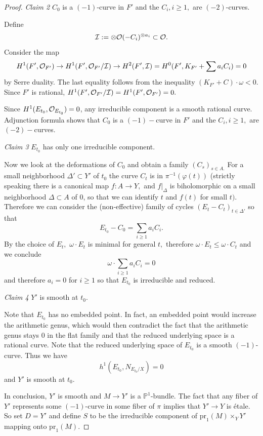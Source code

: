\documentclass[a4, 12pt]{amsart}
\numberwithin{equation}{section}
\theoremstyle{definition}
\def\cI{\mathcal{I}}
\def\P{\mathbb{P}}
\def\P{\mathbb{P}}
\def\cI{\mathcal{I}}
\begin{document}
\begin{proof}
{\it Claim 2} $C_0 $ is a $(-1)$-curve in $F'$ and the $C_i, i \geq 1,$ are $(-2)$-curves.

Define
$$\cI:= \otimes \cO(-C_i)^{\otimes a_i} \subset \cO.$$
Consider the map
$$H^1(F', \cO_{F'}) \to H^1(F', \cO_{F'} / \cI) \to H^2(F', \cI)=H^0(F',K_{F'}+\sum a_i C_i )=0$$
by Serre duality.
The last equality follows from the inequality $(K_{F'}+C) \cdot \omega <0.$
Since $F'$ is rational, $H^1(F', \cO_{F'} / \cI)=H^1(F', \cO_{F'} )=0.$

Since $H^1(E_{t_0}, \mathcal{O}_{E_{t_0}})=0$, any irreducible component is a smooth rational curve.
Adjunction formula shows that
$C_0 $ is a $(-1)-$curve in $F'$ and the $C_i, i \geq 1,$ are $(-2)-$curves.

{\it Claim 3} $E_{t_0}$ has only one irreducible component.

Now we look at the deformations of $C_0$ and obtain a family
$(C_s)_{s \in A.}$ For a small neighborhood $\Delta' \subset Y'$ of $t_0$ the curve $C_t $ is in $\pi^{-1}(\varphi(t))$
(strictly speaking there is a canonical map $f: A \to Y,$ and $f\vert_\Delta $ is biholomorphic on a small neighborhood $\Delta \subset A$ of $0$, so that
we can identify $t$ and $f(t)$ for small $t).$
Therefore we can consider the (non-effective) family of cycles $(E_t - C_t)_{t \in \Delta'}$ so that
$$ E_{t_0} - C_0 = \sum_{i \geq 1} a_i C_i.$$
By the choice of $E_t,$ $\omega \cdot E_t$ is minimal for general $t,$ therefore $\omega \cdot E_t \leq \omega \cdot C_t$ and
we conclude
$$ \omega \cdot \sum_{i \geq 1} a_i C_i = 0$$
and therefore $a_i = 0$ for $i \geq 1$ so that $E_{t_0}$ is irreducible and reduced.

{\it Claim 4} $Y'$ is smooth at $t_0.$

Note that $E_{t_0}$ has no embedded point.
In fact, an embedded point would increase
the arithmetic genus, which would then contradict the fact that the arithmetic genus
stays 0 in the flat family and that the reduced underlying space is a rational curve.
Note that the reduced underlying space of $E_{t_0}$ is a smooth $(-1)$-curve.
Thus we have
$$ h^1(E_{t_0},N_{E_{t_0}/ X}) = 0$$
and $Y'$ is smooth at $t_0.$

In conclusion, $Y'$ is smooth and $M \to Y'$ is a $\P^1$-bundle.
The
fact that any fiber of $Y'$ represents some $(-1)$-curve in some fiber of $\pi$ implies that $Y' \to Y$ is \'etale.
So set $D = Y'$ and
define $S$ to be the irreducible component of $  \mathrm{pr}_1(M) \times_Y Y'$ mapping onto $\mathrm{pr}_1(M).$
\end{proof}
\end{document}
